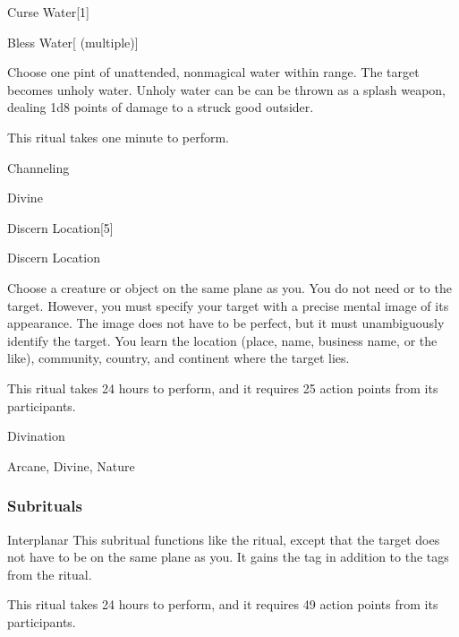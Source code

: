\begin{spellsection}{Curse Water}[1]


\begin{ability}{Bless Water}[ (multiple)]

Choose one pint of unattended, nonmagical water within \rngclose range.
The target becomes unholy water.
Unholy water can be can be thrown as a splash weapon, dealing 1d8 points of damage to a struck good outsider.

This ritual takes one minute to perform.

\end{ability}




 Channeling

 Divine
\end{spellsection}


\begin{spellsection}{Discern Location}[5]


\begin{ability}{Discern Location}

Choose a creature or object on the same plane as you.
You do not need  or  to the target.
However, you must specify your target with a precise mental image of its appearance.
The image does not have to be perfect, but it must unambiguously identify the target.
You learn the location (place, name, business name, or the like), community, country, and continent where the target lies.

This ritual takes 24 hours to perform, and it requires 25 action points from its participants.

\end{ability}




 Divination

 Arcane, Divine, Nature
\end{spellsection}


\subsubsection{Subrituals}


\begin{ability}[\nth{7}]{Interplanar}
This subritual functions like the  ritual, except that the target does not have to be on the same plane as you.
It gains the  tag in addition to the tags from the  ritual.

This ritual takes 24 hours to perform, and it requires 49 action points from its participants.
\end{ability}
\vspace{0.25em}



